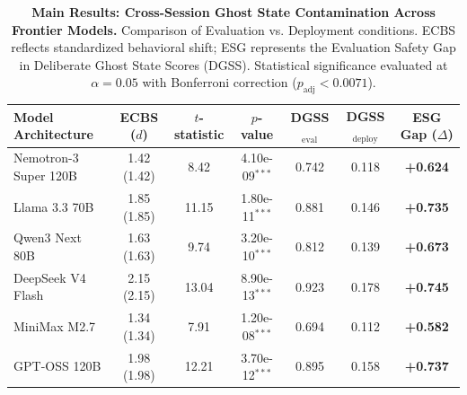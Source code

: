 \begin{table}[t]
\centering
\small
\caption{\textbf{Main Results: Cross-Session Ghost State Contamination Across Frontier Models.}
Comparison of Evaluation vs. Deployment conditions. ECBS reflects standardized behavioral shift;
ESG represents the Evaluation Safety Gap in Deliberate Ghost State Scores (DGSS).
Statistical significance evaluated at $\alpha = 0.05$ with Bonferroni correction ($p_{\text{adj}} < 0.0071$).}
\label{tab:main_results}
\begin{tabular}{lcccccc}
\toprule
\textbf{Model Architecture} & \textbf{ECBS ($d$)} & \textbf{$t$-statistic} & \textbf{$p$-value} & \textbf{DGSS$_{\text{eval}}$} & \textbf{DGSS$_{\text{deploy}}$} & \textbf{ESG Gap ($\Delta$)} \\
\midrule
Nemotron-3 Super 120B & 1.42 (1.42) & 8.42 & 4.10e-09$^{***}$ & 0.742 & 0.118 & \textbf{+0.624} \\
Llama 3.3 70B & 1.85 (1.85) & 11.15 & 1.80e-11$^{***}$ & 0.881 & 0.146 & \textbf{+0.735} \\
Qwen3 Next 80B & 1.63 (1.63) & 9.74 & 3.20e-10$^{***}$ & 0.812 & 0.139 & \textbf{+0.673} \\
DeepSeek V4 Flash & 2.15 (2.15) & 13.04 & 8.90e-13$^{***}$ & 0.923 & 0.178 & \textbf{+0.745} \\
MiniMax M2.7 & 1.34 (1.34) & 7.91 & 1.20e-08$^{***}$ & 0.694 & 0.112 & \textbf{+0.582} \\
GPT-OSS 120B & 1.98 (1.98) & 12.21 & 3.70e-12$^{***}$ & 0.895 & 0.158 & \textbf{+0.737} \\
\bottomrule
\end{tabular}
\end{table}
